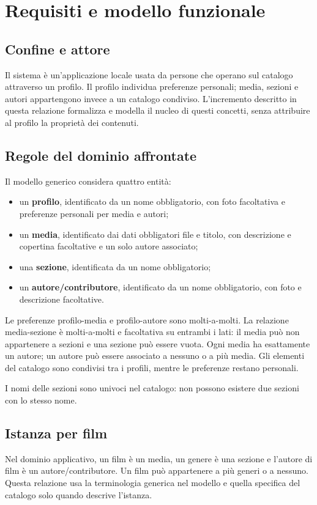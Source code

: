 \chapter{Requisiti e modello funzionale}

\section{Confine e attore}
Il sistema è un'applicazione locale usata da persone che operano sul catalogo attraverso un profilo. Il profilo individua preferenze personali; media, sezioni e autori appartengono invece a un catalogo condiviso. L'incremento descritto in questa relazione formalizza e modella il nucleo di questi concetti, senza attribuire al profilo la proprietà dei contenuti.

\section{Regole del dominio affrontate}
Il modello generico considera quattro entità:
\begin{itemize}
  \item un \textbf{profilo}, identificato da un nome obbligatorio, con foto facoltativa e preferenze personali per media e autori;
  \item un \textbf{media}, identificato dai dati obbligatori file e titolo, con descrizione e copertina facoltative e un solo autore associato;
  \item una \textbf{sezione}, identificata da un nome obbligatorio;
  \item un \textbf{autore/contributore}, identificato da un nome obbligatorio, con foto e descrizione facoltative.
\end{itemize}

Le preferenze profilo-media e profilo-autore sono molti-a-molti. La relazione media-sezione è molti-a-molti e facoltativa su entrambi i lati: il media può non appartenere a sezioni e una sezione può essere vuota. Ogni media ha esattamente un autore; un autore può essere associato a nessuno o a più media. Gli elementi del catalogo sono condivisi tra i profili, mentre le preferenze restano personali.

I nomi delle sezioni sono univoci nel catalogo: non possono esistere due sezioni con lo stesso nome.

\section{Istanza per film}
Nel dominio applicativo, un film è un media, un genere è una sezione e l'autore di film è un autore/contributore. Un film può appartenere a più generi o a nessuno. Questa relazione usa la terminologia generica nel modello e quella specifica del catalogo solo quando descrive l'istanza.
